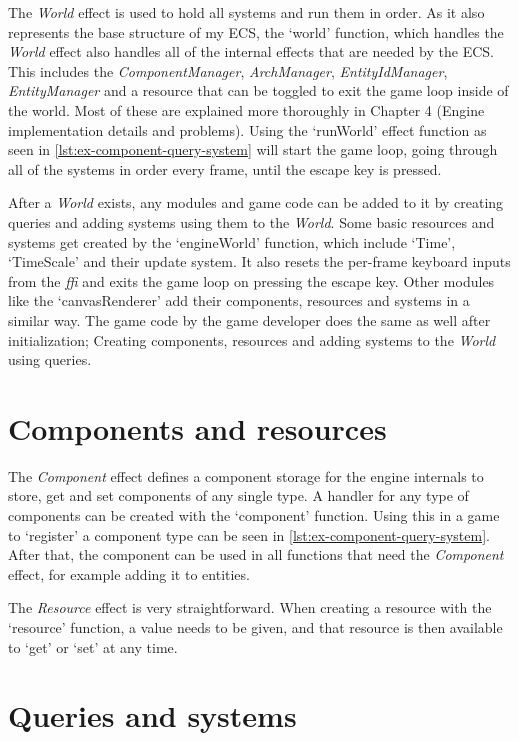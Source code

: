 The \textit{World} effect is used to hold all systems and run them in order. As it also represents the base structure of my ECS, the `world' function, which handles the \textit{World} effect also handles all of the internal effects that are needed by the ECS. This includes the \textit{ComponentManager}, \textit{ArchManager}, \textit{EntityIdManager}, \textit{EntityManager} and a resource that can be toggled to exit the game loop inside of the world. Most of these are explained more thoroughly in Chapter 4 (Engine implementation details and problems). Using the `runWorld' effect function as seen in \cref{lst:ex-component-query-system} will start the game loop, going through all of the systems in order every frame, until the escape key is pressed.

After a \textit{World} exists, any modules and game code can be added to it by creating queries and adding systems using them to the \textit{World}. Some basic resources and systems get created by the `engineWorld' function, which include `Time', `TimeScale' and their update system. It also resets the per-frame keyboard inputs from the \textit{ffi} and exits the game loop on pressing the escape key. Other modules like the `canvasRenderer' add their components, resources and systems in a similar way. The game code by the game developer does the same as well after initialization; Creating components, resources and adding systems to the \textit{World} using queries.

\section{Components and resources}

The \textit{Component} effect defines a component storage for the engine internals to store, get and set components of any single type. A handler for any type of components can be created with the `component' function. Using this in a game to `register' a component type can be seen in \cref{lst:ex-component-query-system}. After that, the component can be used in all functions that need the \textit{Component} effect, for example adding it to entities.

The \textit{Resource} effect is very straightforward. When creating a resource with the `resource' function, a value needs to be given, and that resource is then available to `get' or `set' at any time.

\section{Queries and systems}


